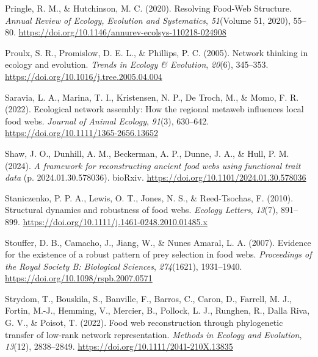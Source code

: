 \documentclass[
]{article}
\newlength{\cslhangindent}
\newenvironment{CSLReferences}[2] %
 {\begin{list}{}{%
  \setlength{\itemindent}{0pt}
  \setlength{\leftmargin}{0pt}
  \setlength{\parsep}{0pt}
  \ifodd #1
   \setlength{\leftmargin}{\cslhangindent}
   \setlength{\itemindent}{-1\cslhangindent}
  \fi
  \setlength{\itemsep}{#2\baselineskip}}}
 {\end{list}}
\begin{document}
\begin{CSLReferences}{1}{0}
Pringle, R. M., \& Hutchinson, M. C. (2020). Resolving {Food-Web
Structure}. \emph{Annual Review of Ecology, Evolution and Systematics},
\emph{51}(Volume 51, 2020), 55--80.
\url{https://doi.org/10.1146/annurev-ecolsys-110218-024908}

Proulx, S. R., Promislow, D. E. L., \& Phillips, P. C. (2005). Network
thinking in ecology and evolution. \emph{Trends in Ecology \&
Evolution}, \emph{20}(6), 345--353.
\url{https://doi.org/10.1016/j.tree.2005.04.004}

Saravia, L. A., Marina, T. I., Kristensen, N. P., De Troch, M., \& Momo,
F. R. (2022). Ecological network assembly: {How} the regional metaweb
influences local food webs. \emph{Journal of Animal Ecology},
\emph{91}(3), 630--642. \url{https://doi.org/10.1111/1365-2656.13652}

Shaw, J. O., Dunhill, A. M., Beckerman, A. P., Dunne, J. A., \& Hull, P.
M. (2024). \emph{A framework for reconstructing ancient food webs using
functional trait data} (p. 2024.01.30.578036). bioRxiv.
\url{https://doi.org/10.1101/2024.01.30.578036}

Staniczenko, P. P. A., Lewis, O. T., Jones, N. S., \& Reed-Tsochas, F.
(2010). Structural dynamics and robustness of food webs. \emph{Ecology
Letters}, \emph{13}(7), 891--899.
\url{https://doi.org/10.1111/j.1461-0248.2010.01485.x}

Stouffer, D. B., Camacho, J., Jiang, W., \& Nunes Amaral, L. A. (2007).
Evidence for the existence of a robust pattern of prey selection in food
webs. \emph{Proceedings of the Royal Society B: Biological Sciences},
\emph{274}(1621), 1931--1940.
\url{https://doi.org/10.1098/rspb.2007.0571}

Strydom, T., Bouskila, S., Banville, F., Barros, C., Caron, D., Farrell,
M. J., Fortin, M.-J., Hemming, V., Mercier, B., Pollock, L. J., Runghen,
R., Dalla Riva, G. V., \& Poisot, T. (2022). Food web reconstruction
through phylogenetic transfer of low-rank network representation.
\emph{Methods in Ecology and Evolution}, \emph{13}(12), 2838--2849.
\url{https://doi.org/10.1111/2041-210X.13835}


\end{CSLReferences}
\end{document}
